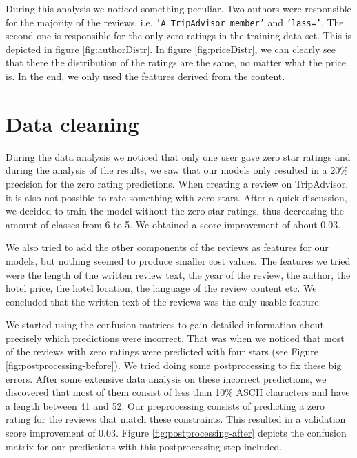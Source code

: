 \documentclass[a4paper,12pt]{article}
\begin{document}
During this analysis we noticed something peculiar. Two authors were responsible for the majority of the reviews, i.e. \texttt{'A TripAdvisor member'} and \texttt{'lass='}. The second one is responsible for the only zero-ratings in the training data set. This is depicted in figure \ref{fig:authorDistr}. In figure \ref{fig:priceDistr}, we can clearly see that there the distribution of the ratings are the same, no matter what the price is. In the end, we only used the features derived from the content.

\section{Data cleaning}
During the data analysis we noticed that only one user gave zero star ratings and during the analysis of the results, we saw that our models only resulted in a 20\% precision for the zero rating predictions. When creating a review on TripAdvisor, it is also not possible to rate something with zero stars. After a quick discussion, we decided to train the model without the zero star ratings, thus decreasing the amount of classes from 6 to 5. We obtained a score improvement of about $0.03$.

We also tried to add the other components of the reviews as features for our models, but nothing seemed to produce smaller cost values. The features we tried were the length of the written review text, the year of the review, the author, the hotel price, the hotel location, the language of the review content etc. We concluded that the written text of the reviews was the only usable feature.

We started using the confusion matrices to gain detailed information about precisely which predictions were incorrect. That was when we noticed that most of the reviews with zero ratings were predicted with four stars (see Figure \ref{fig:postprocessing-before}). We tried doing some postprocessing to fix these big errors. After some extensive data analysis on these incorrect predictions, we discovered that most of them consist of less than 10\% ASCII characters and have a length between 41 and 52. Our preprocessing consists of predicting a zero rating for the reviews that match these constraints. This resulted in a validation score improvement of $0.03$. Figure \ref{fig:postprocessing-after} depicts the confusion matrix for our predictions with this postprocessing step included.
\end{document}
